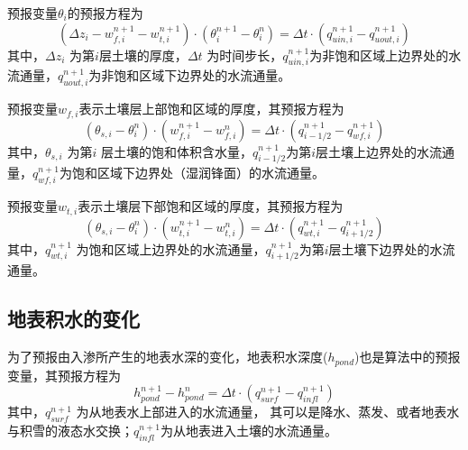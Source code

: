 预报变量$\theta_i$的预报方程为
\begin{equation}\label{si_in1}
\left(\Delta z_{i}-w_{f, i}^{n+1}-w_{t, i}^{n+1}\right) \cdot\left(\theta_{i}^{n+1}-\theta_{i}^{n}\right)=\Delta t \cdot\left(q_{ {uin,i }}^{n+1}-q_{uout,i}^{n+1}\right)
\end{equation}
其中，$\Delta z_i$ 为第$ i $层土壤的厚度，$\Delta t$ 为时间步长，$q_{uin,i}^{n+1}$为非饱和区域上边界处的水流通量，$q_{uout,i}^{n+1}$为非饱和区域下边界处的水流通量。


预报变量$w_{f,i}$表示土壤层上部饱和区域的厚度，其预报方程为
\begin{equation}\label{si_in2}
\left(\theta_{s, i}-\theta_{i}^{n}\right) \cdot\left(w_{f, i}^{n+1}-w_{f, i}^{n}\right)=\Delta t \cdot\left(q_{i-1/2}^{n+1}-q_{w f, i}^{n+1}\right)
\end{equation}
其中，$\theta_{s,i}$ 为第$ i$ 层土壤的饱和体积含水量，$ q_{{i-1/2}}^{n+1}$为第$i$层土壤上边界处的水流通量，$q_{wf,i}^{n+1}$为饱和区域下边界处（湿润锋面）的水流通量。


预报变量$w_{t,i}$表示土壤层下部饱和区域的厚度，其预报方程为
\begin{equation}\label{si_in3}
\left(\theta_{s, i}-\theta_{i}^{n}\right) \cdot\left(w_{t, i}^{n+1}-w_{t, i}^{n}\right)=\Delta t \cdot\left(q_{w t, i}^{n+1}-q_{i+1 / 2}^{n+1}\right)
\end{equation}
其中，$q_{wt,i}^{n+1}$  为饱和区域上边界处的水流通量，$q_{i+1/2}^{n+1}$为第$i$层土壤下边界处的水流通量。



\subsection{地表积水的变化}
为了预报由入渗所产生的地表水深的变化，地表积水深度($h_{pond}$)也是算法中的预报变量，其预报方程为
\begin{equation}\label{hpond}
h_{ {pond }}^{n+1}-h_{ {pond }}^{n}=\Delta t \cdot\left(q_{ {surf }}^{n+1}-q_{ {infl }}^{n+1}\right)
\end{equation}
其中，$q_{surf}^{n+1} $ 为从地表水上部进入的水流通量，
其可以是降水、蒸发、或者地表水与积雪的液态水交换；$q_{infl}^{n+1}$为从地表进入土壤的水流通量。


